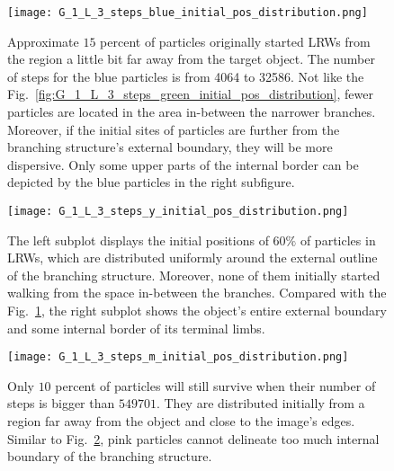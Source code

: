        \begin{figure}
         \centering
         \texttt{[image: G\_1\_L\_3\_steps\_blue\_initial\_pos\_distribution.png]}
         \caption{Approximate $15$ percent of particles originally started LRWs from the region a little bit far away from the target object. The number of steps for the blue particles is from 4064 to 32586. Not like the Fig.~\ref{fig:G_1_L_3_steps_green_initial_pos_distribution}, fewer particles are located in the area in-between the narrower branches. Moreover, if the initial sites of particles are further from the branching structure's external boundary, they will be more dispersive. Only some upper parts of the internal border can be depicted by the blue particles in the right subfigure. }
         \label{fig:G_1_L_3_steps_blue_initial_pos_distribution}
       \end{figure}
       

       \begin{figure}
         \centering
         \texttt{[image: G\_1\_L\_3\_steps\_y\_initial\_pos\_distribution.png]}
         \caption{The left subplot displays the initial positions of $60\%$ of particles in LRWs, which are distributed uniformly around the external outline of the branching structure. Moreover, none of them initially started walking from the space in-between the branches. Compared with the Fig.~\ref{fig:G_1_L_3_steps_blue_initial_pos_distribution}, the right subplot shows the object's entire external boundary and some internal border of its terminal limbs.}
         \label{fig:G_1_L_3_steps_yellow_initial_pos_distribution}
       \end{figure}


       \begin{figure}
         \centering
         \texttt{[image: G\_1\_L\_3\_steps\_m\_initial\_pos\_distribution.png]}
         \caption{Only $10$ percent of particles will still survive when their number of steps is bigger than $549701$. They are distributed initially from a region far away from the object and close to the image's edges. Similar to Fig.~\ref{fig:G_1_L_3_steps_yellow_initial_pos_distribution}, pink particles cannot delineate too much internal boundary of the branching structure.}
         \label{fig:G_1_L_3_steps_pink_initial_pos_distribution}
       \end{figure}


